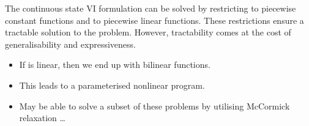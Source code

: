 The continuous state VI formulation can be solved by restricting \Reward to piecewise constant functions and \Transition to piecewise linear functions. These restrictions ensure a tractable solution to the problem. However, tractability comes at the cost of generalisability and expressiveness.

\begin{itemize}
    \item If \Reward is linear, then we end up with bilinear functions. 
    \item This leads to a parameterised nonlinear program.
    \item May be able to solve a subset of these problems by utilising McCormick relaxation \ldots 
\end{itemize}

